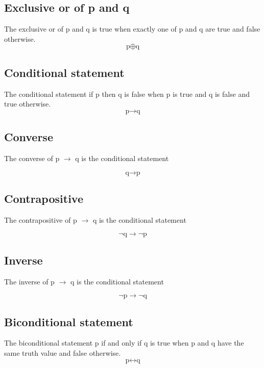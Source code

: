 \documentclass[12pt]{article}
\begin{document}
\subsection{Exclusive or of p and q}
The exclusive or of p and q
is true
when
exactly one of p and q are true
and false otherwise.
\begin{equation}
\mbox{p} \oplus \mbox{q}
\end{equation}

\subsection{Conditional statement}
The conditional statement if p then q
is false
when
p is true and q is false
and true otherwise.
\begin{equation}
\mbox{p} \rightarrow \mbox{q}
\end{equation}

\subsection{Converse}
The converse of p $\rightarrow$ q
is the conditional statement

\begin{equation}
\mbox{q} \rightarrow \mbox{p}
\end{equation}

\subsection{Contrapositive}
The contrapositive of p $\rightarrow$ q
is the conditional statement

\begin{equation}
\neg \mbox{q} \rightarrow \neg \mbox{p}
\end{equation}

\subsection{Inverse}
The inverse of p $\rightarrow$ q
is the conditional statement

\begin{equation}
\neg \mbox{p} \rightarrow \neg \mbox{q}
\end{equation}

\subsection{Biconditional statement}
The biconditional statement p if and only if q
is true
when
p and q have the same truth value
and false otherwise.
\begin{equation}
\mbox{p} \leftrightarrow \mbox{q}
\end{equation}
\end{document}
